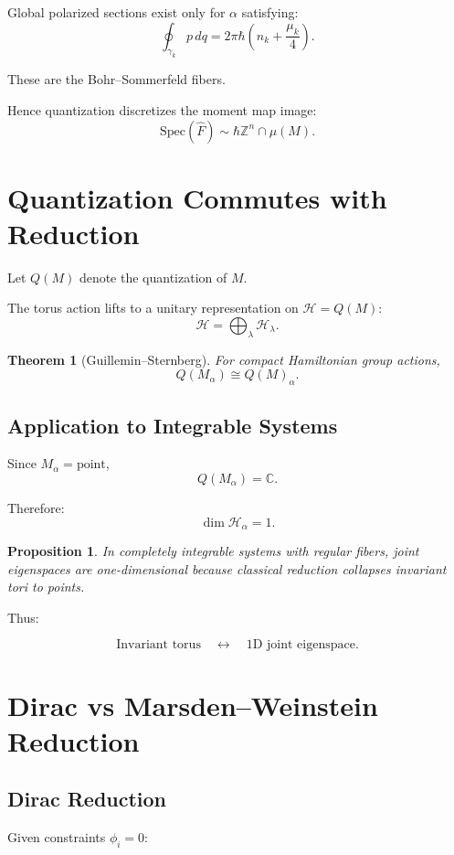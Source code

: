 \documentclass[11pt]{article}
\newtheorem{theorem}{Theorem}
\newtheorem{proposition}{Proposition}
\begin{document}
Global polarized sections exist only for $\alpha$ satisfying:
\[
\oint_{\gamma_k} p\,dq = 2\pi\hbar \left(n_k + \frac{\mu_k}{4}\right).
\]

These are the Bohr--Sommerfeld fibers.

Hence quantization discretizes the moment map image:
\[
\mathrm{Spec}(\hat F) \sim \hbar \mathbb{Z}^n \cap \mu(M).
\]

\section{Quantization Commutes with Reduction}

Let $Q(M)$ denote the quantization of $M$.

The torus action lifts to a unitary representation on $\mathcal{H}=Q(M)$:
\[
\mathcal{H} = \bigoplus_{\lambda} \mathcal{H}_\lambda.
\]

\begin{theorem}[Guillemin--Sternberg]
For compact Hamiltonian group actions,
\[
Q(M_\alpha) \cong Q(M)_\alpha.
\]
\end{theorem}

\subsection{Application to Integrable Systems}

Since $M_\alpha = \text{point}$,
\[
Q(M_\alpha) = \mathbb{C}.
\]

Therefore:
\[
\dim \mathcal{H}_\alpha = 1.
\]

\begin{proposition}
In completely integrable systems with regular fibers, joint eigenspaces are one-dimensional because classical reduction collapses invariant tori to points.
\end{proposition}

Thus:

\[
\text{Invariant torus}
\quad \longleftrightarrow \quad
\text{1D joint eigenspace}.
\]

\section{Dirac vs Marsden--Weinstein Reduction}

\subsection{Dirac Reduction}

Given constraints $\phi_i=0$:
\end{document}
